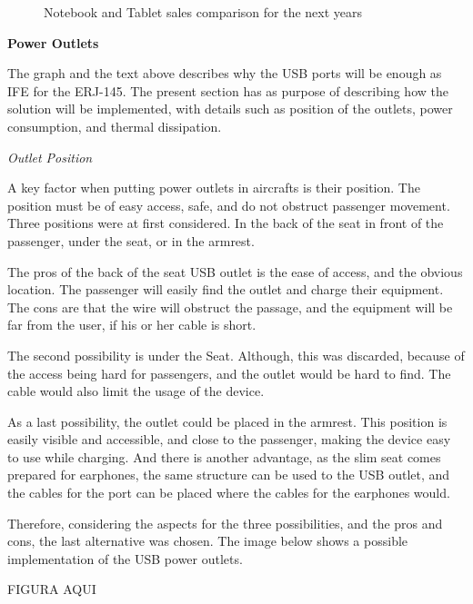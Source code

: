 \begin{figure}[H] %
\caption{Notebook and Tablet sales comparison for the next years}
\label{fig:tabletvsnotebook}
\end{figure}

\textbf{Power Outlets}

The graph and the text above describes why the USB ports will be enough as IFE for the ERJ-145. The present section has as purpose of describing how the solution will be implemented, with details such as position of the outlets, power consumption, and thermal dissipation.

\textit{Outlet Position}

A key factor when putting power outlets in aircrafts is their position. The position must be of easy access, safe, and do not obstruct passenger movement. Three positions were at first considered. In the back of the seat in front of the passenger, under the seat, or in the armrest.

The pros of the back of the seat USB outlet is the ease of access, and the obvious location. The passenger will easily find the outlet and charge their equipment. The cons are that the wire will obstruct the passage, and the equipment will be far from the user, if his or her cable is short.

The second possibility is under the Seat. Although, this was discarded, because of the access being hard for passengers, and the outlet would be hard to find. The cable would also limit the usage of the device.

As a last possibility, the outlet could be placed in the armrest. This position is easily visible and accessible, and close to the passenger, making the device easy to use while charging. And there is another advantage, as the slim seat comes prepared for earphones, the same structure can be used to the USB outlet, and the cables for the port can be placed where the cables for the earphones would.

Therefore, considering the aspects for the three possibilities, and the pros and cons, the last alternative was chosen. The image below shows a possible implementation of the USB power outlets.


{\Huge FIGURA AQUI}

